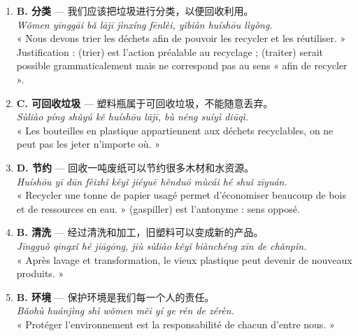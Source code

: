 \documentclass[11pt]{article}
\newcommand{\zh}[1]{\ifmmode\text{#1}\else{#1}\fi}
\begin{document}
\begin{corrige}
\begin{enumerate}
    \item \textbf{B. 分类} — 我们应该把垃圾进行分类，以便回收利用。\\ \emph{Wǒmen yīnggāi bǎ lājī jìnxíng fēnlèi, yǐbiàn huíshōu lìyòng.}\\ « Nous devons trier les déchets afin de pouvoir les recycler et les réutiliser. » Justification : \zh{分类} (trier) est l'action préalable au recyclage ; \zh{处理} (traiter) serait possible grammaticalement mais ne correspond pas au sens « afin de recycler ».
    \item \textbf{C. 可回收垃圾} — 塑料瓶属于可回收垃圾，不能随意丢弃。\\ \emph{Sùliào píng shǔyú kě huíshōu lājī, bù néng suíyì diūqì.}\\ « Les bouteilles en plastique appartiennent aux déchets recyclables, on ne peut pas les jeter n'importe où. »
    \item \textbf{D. 节约} — 回收一吨废纸可以节约很多木材和水资源。\\ \emph{Huíshōu yī dūn fèizhǐ kěyǐ jiéyuē hěnduō mùcái hé shuǐ zīyuán.}\\ « Recycler une tonne de papier usagé permet d'économiser beaucoup de bois et de ressources en eau. » \zh{浪费} (gaspiller) est l'antonyme : sens opposé.
    \item \textbf{B. 清洗} — 经过清洗和加工，旧塑料可以变成新的产品。\\ \emph{Jīngguò qīngxǐ hé jiāgōng, jiù sùliào kěyǐ biànchéng xīn de chǎnpǐn.}\\ « Après lavage et transformation, le vieux plastique peut devenir de nouveaux produits. »
    \item \textbf{B. 环境} — 保护环境是我们每一个人的责任。\\ \emph{Bǎohù huánjìng shì wǒmen měi yí ge rén de zérèn.}\\ « Protéger l'environnement est la responsabilité de chacun d'entre nous. »
\end{enumerate}
\end{corrige}
\end{document}
